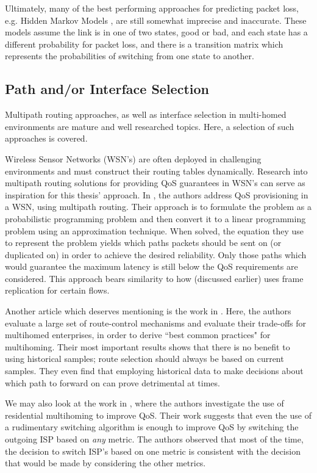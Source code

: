 Ultimately, many of the best performing approaches for predicting packet loss, e.g. Hidden Markov Models \cite{tao2004exploring, bremler2002predicting}, are still somewhat imprecise and inaccurate. These models assume the link is in one of two states, good or bad, and each state has a different probability for packet loss, and there is a transition matrix which represents the probabilities of switching from one state to another.

\subsection{Path and/or Interface Selection}

Multipath routing approaches, as well as interface selection in multi-homed environments are mature and well researched topics. Here, a selection of such approaches is covered.

Wireless Sensor Networks (WSN's) are often deployed in challenging environments and must construct their routing tables dynamically. Research into multipath routing solutions for providing QoS guarantees in WSN's can serve as inspiration for this thesis' approach. In  \cite{huang2008multiconstrained}, the authors address QoS provisioning in a WSN, using multipath routing. Their approach is to formulate the problem as a probabilistic programming problem and then convert it to a linear programming problem using an approximation technique. When solved, the equation they use to represent the problem yields which paths packets should be sent on (or duplicated on) in order to achieve the desired reliability. Only those paths which would guarantee the maximum latency is still below the QoS requirements are considered. This approach bears similarity to how \cite{prados2021asynchronous} (discussed earlier) uses frame replication for certain flows.

Another article which deserves mentioning is the work in \cite{akella2008performance}. Here, the authors evaluate a large set of route-control mechanisms and evaluate their trade-offs for multihomed enterprises, in order to derive “best common practices" for multihoming. Their most important results shows that there is no benefit to using historical samples; route selection should always be based on current samples. They even find that employing historical data to make decisions about which path to forward on can prove detrimental at times.

We may also look at the work in \cite{habib2007improving}, where the authors investigate the use of residential multihoming to improve QoS. Their work suggests that even the use of a rudimentary switching algorithm is enough to improve QoS by switching the outgoing ISP based on \textit{any} metric. The authors observed that most of the time, the decision to switch ISP's based on one metric is consistent with the decision that would be made by considering the other metrics.

